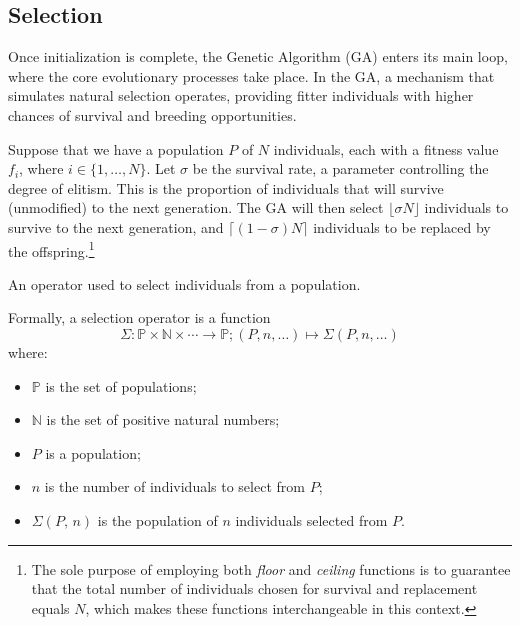 \subsection{Selection}
\label{sec:background:genetic_algorithms:selection}
  Once initialization is complete, the Genetic Algorithm (GA) enters its main loop, where the core 
  evolutionary processes take place.
  In the GA, a mechanism that simulates natural selection operates, providing fitter individuals 
  with higher chances of survival and breeding opportunities.

  Suppose that we have a population \(P\) of \(N\) individuals, each with a fitness value \(f_i\), 
  where \(i \in \{1, \ldots, N\}\).
  Let \(\sigma\) be the survival rate, a parameter controlling the degree of elitism.
  This is the proportion of individuals that will survive (unmodified) to the next generation.
  The GA will then select \(\lfloor\sigma N\rfloor\) individuals to survive to the next generation,
  and \(\lceil(1 - \sigma)N\rceil\) individuals to be replaced by the offspring.\footnote{
    The sole purpose of employing both \textit{floor} and \textit{ceiling} functions is to guarantee
    that the total number of individuals chosen for survival and replacement equals \(N\), which
    makes these functions interchangeable in this context.
  }

  \begin{definition}
    \label{def:selection_operator}
      An operator used to select individuals from a population.

      Formally, a selection operator is a function 
      \[
        \Sigma : \mathbb{P} \times \mathbb{N} \times \cdots \to \mathbb{P};
        (P, n, \dots) \mapsto \Sigma(P, n, \dots)
      \]
      where: 
      
      \begin{itemize}
        \item \(\mathbb{P}\) is the set of populations;
        \item \(\mathbb{N}\) is the set of positive natural numbers;
        \item \(P\) is a population;
        \item \(n\) is the number of individuals to select from \(P\);
        \item \(\Sigma(P,\, n)\) is the population of \(n\) individuals selected from \(P\).
      \end{itemize}
  \end{definition}

